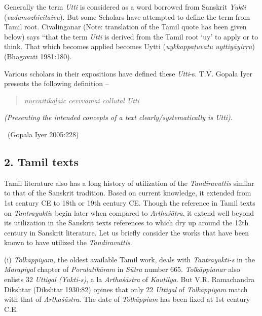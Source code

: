 Generally the term \textit{Utti} is considered as a word borrowed from Sanskrit \textit{Yukti} (\textit{vadamozhicitaivu}). But some Scholars have attempted to define the term from Tamil root. Civalinganar (Note: translation of the Tamil quote has been given below) says “that the term \textit{Utti} is derived from the Tamil root ‘uy’ to apply or to think. That which becomes applied becomes Uytti (\textit{uykkappaṭuvatu uyttiyāyiṛṛu})\hfill (Bhagavati 1981:180).

Various scholars in their expositions have defined these \textit{Utti}-s. T.V. Gopala Iyer presents the following definition –

\begin{verse}
\textit{nūṛcaitikaḻaic cevvvamai collutal Utti}
\end{verse}

\begin{myquote}
\textit{(Presenting the intended concepts of a text clearly/systematically is Utti).}

~\hfill (Gopala Iyer 2005:228)
\end{myquote}


\subsection*{2. Tamil texts}

Tamil literature also has a long history of utilization of the \textit{Tandiravuttis} similar to that of the Sanskrit tradition. Based on current knowledge, it extended from 1st century CE to 18th or 19th century CE. Though the reference in Tamil texts on \textit{Tantrayukti}s begin later when compared to \textit{Arthaśātra}, it extend well beyond its utilization in the Sanskrit texts references to which dry up around the 12th century in Sanskrit literature. Let us briefly consider the works that have been known to have utilized the \textit{Tandiravuttis}.

(i) \textit{Tolkāppiyam,} the oldest available Tamil work, deals with \textit{Tantrayukti-s} in the \textit{Marapiyal} chapter of \textit{Porulatikāram} in \textit{Sūtra} number 665. \textit{Tolkāppianar} also enlists 32 \textit{Uttigal (Yukti-s)}, a la \textit{Arthaśāstra} of \textit{Kauṭilya}. But V.R. Ramachandra Dikshtar (Dikshtar 1930:82) opines that only 22 \textit{Uttigal} of \textit{Tolkāppiyam} match with that of \textit{Arthaśāstra}. The date of \textit{Tolkāppiam} has been fixed at 1st century C.E.

